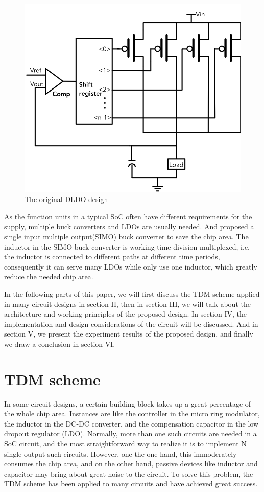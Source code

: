 \documentclass[draftcls, journal]{IEEEtran}
\begin{document}
\begin{figure}[t]
    \centering
    \includegraphics[width=\linewidth]{pic/DLDOsche/originalDLDO.png}
    \caption{The original DLDO design}
    \label{basicDLDO}
\end{figure}
As the function units in a typical SoC often have different requirements for the supply, multiple buck converters and LDOs are usually needed. And \cite{SIMODCDC,SIMODCDC1,SIMODCDC2} proposed a single input multiple output(SIMO) buck converter to save the chip area. The inductor in the SIMO buck converter is working time division multiplexed, i.e. the inductor is connected to different paths at different time periods, consequently it can serve many LDOs while only use one inductor, which greatly reduce the needed chip area.

In the following parts of this paper, we will first discuss the TDM scheme applied in many circuit designs in section II, then in section III, we will talk about the architecture and working principles of the proposed design. In section IV, the implementation and design considerations of the circuit will be discussed. And in section V, we present the experiment results of the proposed design, and finally we draw a conclusion in section VI.
\section{TDM scheme}
In some circuit designs, a certain building block takes up a great percentage of the whole chip area. Instances are like the controller in the micro ring modulator, the inductor in the DC-DC converter, and the compensation capacitor in the low dropout regulator (LDO). Normally, more than one such circuits are needed in a SoC circuit, and the most straightforward way to realize it is to implement N single output such circuits. However, one the one hand, this immoderately consumes the chip area, and on the other hand, passive devices like inductor and capacitor may bring about great noise to the circuit. To solve this problem, the TDM scheme has been applied to many circuits and have achieved great success.
\end{document}
